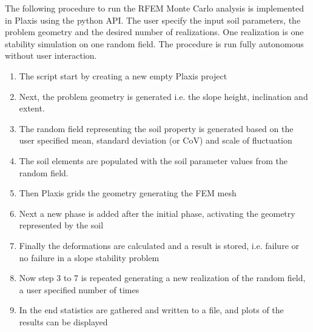 The following procedure to run the RFEM Monte Carlo analysis is implemented in Plaxis using the python API.
The user specify the input soil parameters, the problem geometry and the desired number of realizations. One realization is one stability simulation on one random field. The procedure is run fully autonomous without user interaction.

\begin{enumerate}
	\item{The script start by creating a new empty Plaxis project}
	\item{Next, the problem geometry is generated i.e. the slope height, inclination and extent.}
	\item{The random field representing the soil property is generated based on the user specified mean, standard deviation (or CoV) and scale of fluctuation}
		
	\item{The soil elements are populated with the soil parameter values from the random field.}
	\item{Then Plaxis grids the geometry generating the FEM mesh}
	\item{Next a new phase is added after the initial phase, activating the geometry represented by the soil}
	\item{Finally the deformations are calculated and a result is stored, i.e. failure or no failure in a slope stability problem}
	\item{Now step 3 to 7 is repeated generating a new realization of the random field, a user specified number of times}
	\item{In the end statistics are gathered and written to a file, and plots of the results can be displayed}

\end{enumerate}
